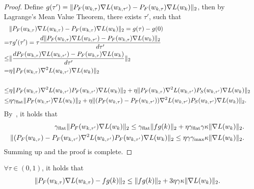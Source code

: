     \begin{proof}
        Define $g(\tau') = \| {P}_F(w_{k, \tau}) \nabla L(w_{k, \tau'}) - {P}_F(w_{k, \tau}) \nabla L(w_k) \|_2  $, then by  Lagrange's Mean Value Theorem, there exists $\tau'$, such that
        \begin{align*}
            &\|  {P}_F(w_{k, \tau}) \nabla L(w_{k, \tau}) - {P}_F(w_{k, \tau}) \nabla L(w_k) \|_2 = g(\tau) - g(0) \\
            =& \tau g'(\tau') = \tau \frac{ d \|  {P}_F(w_{k, \tau}) \nabla L(w_{k, \tau'}) - {P}_F(w_{k, \tau}) \nabla L(w_k) \|_2}{d\tau'} \\
            \le& \| \frac{ d   {P}_F(w_{k, \tau}) \nabla L(w_{k, \tau'}) - {P}_F(w_{k, \tau}) \nabla L(w_k) }{d\tau'} \|_2 \\
            =& \eta \| {P}_F(w_{k, \tau}) \nabla^2 L(w_{k, \tau'}) \nabla L(w_k) \|_2 \\
             \\
            \le & \eta  \| {P}_F(w_{k, \tau}) \nabla^2 L(w_{k, \tau'}) {P}_F (w_{k, \tau'}) \nabla L(w_k) \|_2  + \eta \| {P}_F(w_{k, \tau}) \nabla^2 L(w_{k, \tau'}) {P}_S (w_{k, \tau'}) \nabla L(w_k) \|_2 \\
            \le & \eta \gamma_{\mathrm{flat}} \|  {P}_F (w_{k, \tau'}) \nabla L(w_k) \|_2 + \eta \| ({P}_F(w_{k, \tau}) - {P}_F(w_{k, \tau'})) \nabla^2 L(w_{k, \tau'}) {P}_S (w_{k, \tau'}) \nabla L(w_k) \|_2.
        \end{align*}
        By~, it holds that
        \begin{align*}
            \gamma_{\mathrm{flat}} \|  {P}_F (w_{k, \tau'}) \nabla L(w_k) \|_2 \le \gamma_{\mathrm{flat}} \| fg(k) \|_2 + \eta \gamma_{\mathrm{flat}} \gamma \kappa \| \nabla L(w_k)\|_2. \\
            \| ({P}_F(w_{k, \tau}) - {P}_F(w_{k, \tau'}) \nabla^2 L(w_{k, \tau'}) {P}_F (w_{k, \tau'}) \nabla L(w_k) \|_2 \le
            \eta \gamma  \gamma_{\mathrm{max}} \kappa \| \nabla L(w_k)\|_2.
        \end{align*}
        Summing up and the proof is complete.
    \end{proof}

    
    \begin{lemma}
    \label{lem:movegfs}
        $\forall \tau \in (0, 1)$, it holds that 
        \begin{align*}
            \|  {P}_F(w_{k, \tau}) \nabla L(w_{k, \tau}) -fg(k) \|_2 \le  \|  fg(k) \|_2 + 3\eta  \gamma \kappa \| \nabla L(w_k)\|_2.
        \end{align*}
    \end{lemma}

